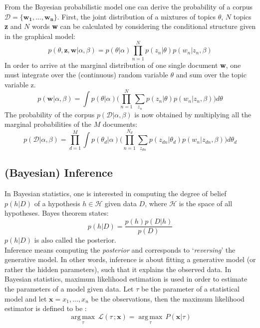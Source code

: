 \documentclass[a4paper,ngerman, english]{atseminar}
\begin{document}
From the Bayesian probabilistic model one can derive the probability of a corpus $\mathcal{D} = \{\boldsymbol{w_1},...,\boldsymbol{w_n}\}$.
First, the joint distribution of a mixtures of topics $\theta$, $N$ topics \textbf{z} and $N$ words \textbf{w} can
be calculated by considering the conditional structure given in the graphical model:
\begin{equation}
p(\theta, \textbf{z}, \textbf{w} | \alpha, \beta) = p(\theta | \alpha) \prod^{N}_{n=1} p(z_n | \theta)p(w_n | z_n,\beta)
\end{equation}
In order to arrive at the marginal distribution of one single document \textbf{w}, one must integrate over the (continuous) random variable $\theta$ and sum over the topic variable z.
\begin{equation}
p(\textbf{w} | \alpha, \beta) = \int p(\theta | \alpha) \bigg( \prod^{N}_{n=1} \sum_{z_n} p(z_n | \theta)p(w_n | z_n,\beta) \bigg) d\theta
\end{equation}
The probability of the corpus $p(\mathcal{D} | \alpha, \beta)$ is now obtained by multiplying all the marginal probabilities of the $M$ documents:
\begin{equation}
p(\mathcal{D} | \alpha, \beta) = \prod_{d=1}^{M} \int p(\theta_d | \alpha) \bigg( \prod^{N_d}_{n=1} \sum_{z_{dn}} p(z_{dn} | \theta_d)p(w_n | z_{dn},\beta) \bigg) d\theta_d
\end{equation}



\subsection{(Bayesian) Inference} \label{sec:inference}

In Bayesian statistics, one is interested in computing the degree of belief $p(h | D)$ of a hypothesis $h \in \mathcal{H}$ given data $D$, where $\mathcal{H}$ is the space of all hypotheses. Bayes theorem states:
\begin{equation}
p(h | D) = \frac{p(h)p(D | h)}{p(D)}
\end{equation}
$p(h | D)$ is also called the posterior.\\
Inference means computing the \textit{posterior} and corresponds to `\textit{reversing}' the generative model.
In other words, inference is about fitting a generative model (or rather the hidden parameters), such that it explains the observed data. In Bayesian statistics, maximum likelihood estimation is used in order to estimate the parameters of a model given data.
Let $\tau$ be the parameter of a statistical model and let $\boldsymbol{x} = {x_1,...,x_n}$ be the observations, then the maximum likelihood estimator is defined to be \cite{duda2012pattern}:
\begin{equation} \label{eq:MLE}
\underset{\tau}{\operatorname{arg\,max}} \, \mathcal{L}(\tau\, ; \boldsymbol{x}) = \underset{\tau}{\operatorname{arg\,max}}\, P(\boldsymbol{x} | \tau)
\end{equation}
\end{document}

